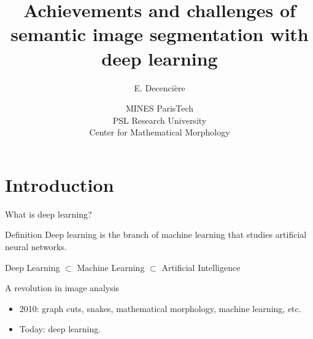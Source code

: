 \documentclass[xcolor=pdftex,dvipsnames,table,mathserif]{beamer}
\title{Achievements and challenges of semantic image segmentation with deep learning}
\author{E. Decencière}
\date{MINES ParisTech\\
  PSL Research University\\
  Center for Mathematical Morphology
}
\begin{document}
\frame{\titlepage}


\section{Introduction}

\begin{frame}{What is deep learning?}

\begin{block}{Definition}
    Deep learning is the branch of machine learning that studies artificial neural networks.
\end{block}

  \begin{block}{}
  \centering
    Deep Learning $\subset$ Machine Learning $\subset$ Artificial Intelligence
  \end{block}



\end{frame}


\begin{frame}{A revolution in image analysis}

\begin{itemize}
\item 2010: graph cuts, snakes, mathematical morphology, machine learning, etc.
\item Today: deep learning.
\end{itemize}

\end{frame}
\end{document}
